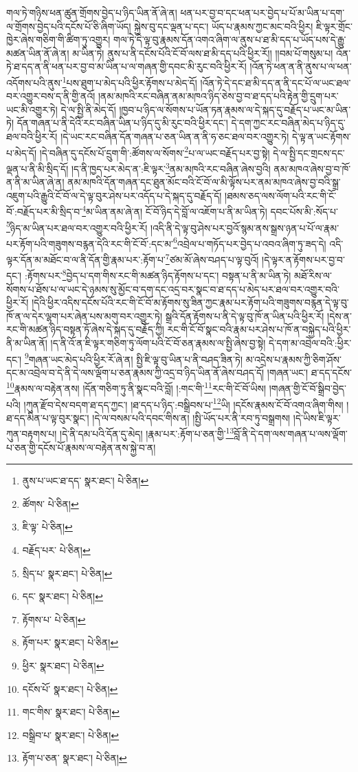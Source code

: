 གལ་ཏེ་གཉིས་ཕན་ཚུན་གྲོགས་བྱེད་པ་ཉིད་ཡིན་ནོ་ཞེ་ན། ཕན་པར་བྱ་བ་དང་ཕན་པར་བྱེད་པ་པོ་མ་ཡིན་པ་དག་ལ་གྲོགས་བྱེད་པའི་དངོས་པོ་ཅི་ཞིག་ཡོད། སྐྱེས་བུ་དང་ལྡན་པ་དང་། ཡོད་པ་རྣམས་ཀྱང་མང་བའི་ཕྱིར། ཇི་ལྟར་གྲོང་ཁྱེར་ཞེས་གཅིག་གི་ཚིག་ཏུ་འགྱུར། གལ་ཏེ་དེ་ལྟ་བུ་རྣམས་དོན་འགའ་ཞིག་ལ་ནུས་པ་ཐ་མི་དད་པ་ཡོད་པས་དེ་རྒྱུ་མཚན་ཡིན་ནོ་ཞེ་ན། མ་ཡིན་ཏེ། ནུས་པ་ནི་དངོས་པོའི་ངོ་བོ་ལས་ཐ་མི་དད་པའི་ཕྱིར་རོ།། །།བམ་པོ་གསུམ་པ། འོན་ཏེ་ཐ་དད་ན་ནི་ཕན་པར་བྱ་བ་མ་ཡིན་པ་ལ་གཞན་གྱི་དབང་མི་རུང་བའི་ཕྱིར་རོ། །འོན་ཏེ་ཕན་ན་ནི་ནུས་པ་ལ་ཕན་འདོགས་པའི་ནུས་\footnote{ནུས་པ་ཡང་ཐ་དད་  སྣར་ཐང་།  པེ་ཅིན། }པས་ཐུག་པ་མེད་པའི་ཕྱིར་རྟོགས་པ་མེད་དོ། །འོན་ཏེ་དེ་དང་ཐ་མི་དད་ན་ནི་དང་པོ་ལ་ཡང་ཐལ་བར་འགྱུར་བས་ད་ནི་གྱི་ནའོ། །ནམ་མཁའི་རང་བཞིན་ནམ་མཁའ་ཉིད་ཅེས་བྱ་བ་ཐ་དད་པའི་རྟེན་གྱི་དྲུག་པར་ཡང་མི་འགྱུར་ཏེ། དེ་ལ་སྤྱི་ནི་མེད་དོ། །ཁྱབ་པ་ཉིད་ལ་སོགས་པ་ཡོན་ཏན་རྣམས་ལ་དེ་སྐད་དུ་བརྗོད་པ་ཡང་མ་ཡིན་ཏེ། དོན་གཞན་པ་ནི་དེའི་རང་བཞིན་ཡིན་པ་ཉིད་དུ་མི་རུང་བའི་ཕྱིར་དང་། དེ་དག་ཀྱང་རང་བཞིན་མེད་པ་ཉིད་དུ་ཐལ་བའི་ཕྱིར་རོ། །དེ་ཡང་རང་བཞིན་དོན་གཞན་པ་ཅན་ཡིན་ན་ནི་ཧ་ཅང་ཐལ་བར་འགྱུར་ཏེ། དེ་ལྟ་ན་ཡང་རྟོགས་པ་མེད་དོ། །དེ་བཞིན་དུ་དངོས་པོ་དྲུག་གི་:ཚོགས་ལ་སོགས་\footnote{ཚོགས་  པེ་ཅིན། }པ་ལ་ཡང་བརྗོད་པར་བྱ་སྟེ། དེ་ལ་སྤྱི་དང་གྲངས་དང་ལྡན་པ་ནི་མི་སྲིད་དོ། །ད་ནི་ཁྱད་པར་མེད་ན་:ཇི་ལྟར་\footnote{ཇི་ལྟ་  པེ་ཅིན། }ནམ་མཁའི་རང་བཞིན་ཞེས་བྱའི། ནམ་མཁའ་ཞེས་བྱ་བ་ཁོ་ན་ནི་མ་ཡིན་ཞེ་ན། ནམ་མཁའི་དོན་གཞན་དང་ཐུན་མོང་བའི་ངོ་བོ་ལ་མི་ལྟོས་པར་ནམ་མཁའ་ཞེས་བྱ་བའི་སྒྲ་འཇུག་པའི་རྒྱུའི་ངོ་བོ་ལ་དེ་ལྟ་བུར་ཤེས་པར་འདོད་པ་དེ་སྐད་དུ་བརྗོད་དོ། །ཐམས་ཅད་ལས་ལོག་པའི་རང་གི་ངོ་བོ་:བརྗོད་པར་མི་སྲིད་བ་\footnote{བརྗོད་པར་  པེ་ཅིན། }མ་ཡིན་ནམ་ཞེ་ན། ངོ་བོ་ཉིད་དེ་བློ་ལ་འཇོག་པ་ནི་མ་ཡིན་ཏེ། དབང་པོས་མི་:སོད་པ་\footnote{སྲིད་པ་  སྣར་ཐང་།  པེ་ཅིན། }ཉིད་མ་ཡིན་པར་ཐལ་བར་འགྱུར་བའི་ཕྱིར་རོ། །འདི་ནི་དེ་ལྟ་བུ་ཤེས་པར་བྱའོ་སྙམ་ནས་སྒྲས་ཉན་པ་པོ་ལ་རྣམ་པར་རྟོག་པའི་གཟུགས་བརྙན་དེའི་རང་གི་ངོ་བོ་:དང་མ་\footnote{དང་  སྣར་ཐང་།  པེ་ཅིན། }འབྲེལ་པ་གཏོད་པར་བྱེད་པ་འབའ་ཞིག་ཏུ་ཟད་དེ། འདི་ལྟར་དོན་མ་མཐོང་བ་ལ་ནི་དོན་གྱི་རྣམ་པར་:རྟོག་པ་\footnote{རྟོགས་པ་  པེ་ཅིན། }ཙམ་མོ་ཞེས་བཤད་པ་ལྟ་བུའོ། །དེ་ལྟར་ན་རྟོགས་པར་བྱ་བ་དང་། :རྟོགས་པར་\footnote{རྟོག་པར་  སྣར་ཐང་།  པེ་ཅིན། }བྱེད་པ་དག་གིས་རང་གི་མཚན་ཉིད་རྟོགས་པ་དང་། བསྟན་པ་ནི་མ་ཡིན་ཏེ། མཐོ་རིས་ལ་སོགས་པ་ཐོས་པ་ལ་ཡང་དེ་ཉམས་སུ་མྱོང་བ་དག་དང་འདྲ་བར་སྣང་བ་ཐ་དད་པ་མེད་པར་ཐལ་བར་འགྱུར་བའི་ཕྱིར་རོ། །དེའི་ཕྱིར་འདིས་དངོས་པོའི་རང་གི་ངོ་བོ་མ་རྟོགས་སུ་ཟིན་ཀྱང་རྣམ་པར་རྟོག་པའི་གཟུགས་བརྙན་དེ་ལྟ་བུ་ཁོ་ན་ལ་དེར་ལྷག་པར་ཞེན་པས་མགུ་བར་འགྱུར་ཏེ། སྒྲའི་དོན་རྟོགས་པ་ནི་དེ་ལྟ་བུ་ཁོ་ན་ཡིན་པའི་ཕྱིར་རོ། །དེས་ན་རང་གི་མཚན་ཉིད་བསྟན་ཏོ་ཞེས་དེ་སྐད་དུ་བརྗོད་ཀྱི། རང་གི་ངོ་བོ་སྣང་བའི་རྣམ་པར་ཤེས་པ་ཁོ་ན་བསྐྱེད་པའི་ཕྱིར་ནི་མ་ཡིན་ནོ། །ད་ནི་འོ་ན་ཇི་ལྟར་གཅིག་ཏུ་ལོག་པའི་ངོ་བོ་ཅན་རྣམས་ལ་སྤྱི་ཞེས་བྱ་སྟེ། དེ་དག་མ་འབྲེལ་བའི་:ཕྱིར་དང་། \footnote{ཕྱིར་  སྣར་ཐང་།  པེ་ཅིན། }གཞན་ཡང་མེད་པའི་ཕྱིར་རོ་ཞེ་ན། སྤྱི་ཇི་ལྟ་བུ་ཡིན་པ་ནི་བཤད་ཟིན་ཏེ། མ་འདྲེས་པ་རྣམས་ཀྱི་ཅིག་ཤོས་དང་མ་འབྲེལ་བ་དེ་ནི་དེ་ལས་ལྡོག་པ་ཅན་རྣམས་ཀྱི་འདྲ་བ་ཉིད་ཡིན་ནོ་ཞེས་བཤད་དོ། །གཞན་ཡང་། ཐ་དད་དངོས་\footnote{དངོས་པོ་  སྣར་ཐང་།  པེ་ཅིན། }རྣམས་ལ་བརྟེན་ནས། །དོན་གཅིག་ཏུ་ནི་སྣང་བའི་བློ། །:གང་གི་\footnote{གང་གིས་  སྣར་ཐང་།  པེ་ཅིན། }རང་གི་ངོ་བོ་ཡིས། །གཞན་གྱི་ངོ་བོ་སྒྲིབ་བྱེད་པའི། །ཀུན་རྫོབ་དེས་བདག་ཐ་དད་ཀྱང་། །ཐ་དད་པ་ཉིད་:བསྒྲིབས་པ་\footnote{བསྒྲིབ་པ་  སྣར་ཐང་།  པེ་ཅིན། }ཡི། །དངོས་རྣམས་ངོ་བོ་འགའ་ཞིག་གིས། །ཐ་དད་མིན་པ་ལྟ་བུར་སྣང་། །དེ་ལ་བསམ་པའི་དབང་གིས་ན། །སྤྱི་ཡོད་པར་ནི་རབ་ཏུ་བསྒྲགས། །དེ་ཡིས་ཇི་ལྟར་ཀུན་བརྟགས་པ། །དེ་ནི་དམ་པའི་དོན་དུ་མེད། །རྣམ་པར་:རྟོག་པ་ཅན་གྱི་\footnote{རྟོག་པ་ཅན་  སྣར་ཐང་།  པེ་ཅིན། }བློ་ནི་དེ་དག་ལས་གཞན་པ་ལས་ལྡོག་པ་ཅན་གྱི་དངོས་པོ་རྣམས་ལ་བརྟེན་ནས་སྐྱེ་བ་ན། 